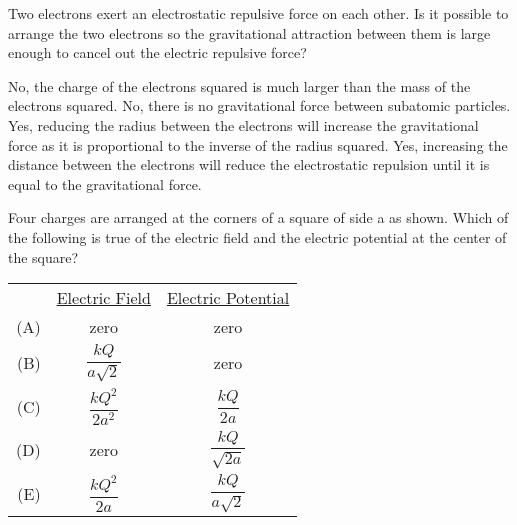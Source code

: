 \documentclass{../../../oss-ap12ibhl-print}
\begin{document}
\begin{questions}
  \question Two electrons exert an electrostatic repulsive force on each other.
  Is it possible to arrange the two electrons so the gravitational attraction
  between them is large enough to cancel out the electric repulsive force?
  \begin{choices}
    \choice  No, the charge of the electrons squared is much larger than the
    mass of the electrons squared.
    \choice No, there is no gravitational force between subatomic particles.
    \choice Yes, reducing the radius between the electrons will increase the
    gravitational force as it is proportional to the inverse of the radius
    squared.
    \choice Yes, increasing the distance between the electrons will reduce the
    electrostatic repulsion until it is equal to the gravitational force.
  \end{choices}
  \vspace{.7in}
    
  \question Four charges are arranged at the corners of a square of side a as
  shown. Which of the following is true of the electric field and the electric
  potential at the center of the square?

  \vspace{.1in}
  \begin{minipage}{.3\linewidth}
  \end{minipage}
  \begin{minipage}{.5\linewidth}
    \begin{tabular}{rcc}
      & \underline{Electric Field} & \underline{Electric Potential}\\
      (A) & zero & zero \\
      (B) & $\dfrac{kQ}{a\sqrt{2}}$ & zero \\
      (C) & $\dfrac{kQ^2}{2a^2}$ &  $\dfrac{kQ}{2a}$\\
      (D) & zero &  $\dfrac{kQ}{\sqrt{2a}}$\\
      (E) & $\dfrac{kQ^2}{2a}$ & $\dfrac{kQ}{a\sqrt{2}}$
    \end{tabular}
  \end{minipage}
    

\end{questions}
\end{document}

